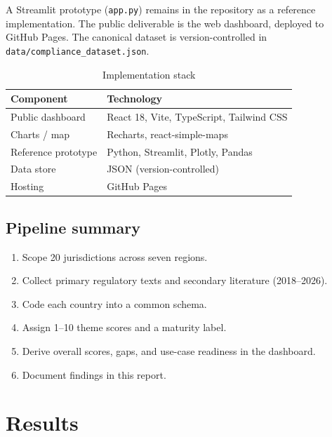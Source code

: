 \documentclass[12pt,a4paper]{report}
\begin{document}
A Streamlit prototype (\texttt{app.py}) remains in the repository as a reference implementation. The public deliverable is the web dashboard, deployed to GitHub Pages.
The canonical dataset is version-controlled in \texttt{data/compliance\_dataset.json}.

\begin{table}[!htbp]
  \centering
  \caption{Implementation stack}
  \label{tab:stack}
  \begin{tabular}{@{}ll@{}}
    \toprule
    \textbf{Component} & \textbf{Technology} \\
    \midrule
    Public dashboard & React 18, Vite, TypeScript, Tailwind CSS \\
    Charts / map & Recharts, react-simple-maps \\
    Reference prototype & Python, Streamlit, Plotly, Pandas \\
    Data store & JSON (version-controlled) \\
    Hosting & GitHub Pages \\
    \bottomrule
  \end{tabular}
\end{table}

\section{Pipeline summary}

\begin{enumerate}
  \item Scope 20 jurisdictions across seven regions.
  \item Collect primary regulatory texts and secondary literature (2018--2026).
  \item Code each country into a common schema.
  \item Assign 1--10 theme scores and a maturity label.
  \item Derive overall scores, gaps, and use-case readiness in the dashboard.
  \item Document findings in this report.
\end{enumerate}

\chapter{Results}
\label{ch:results}
\end{document}

